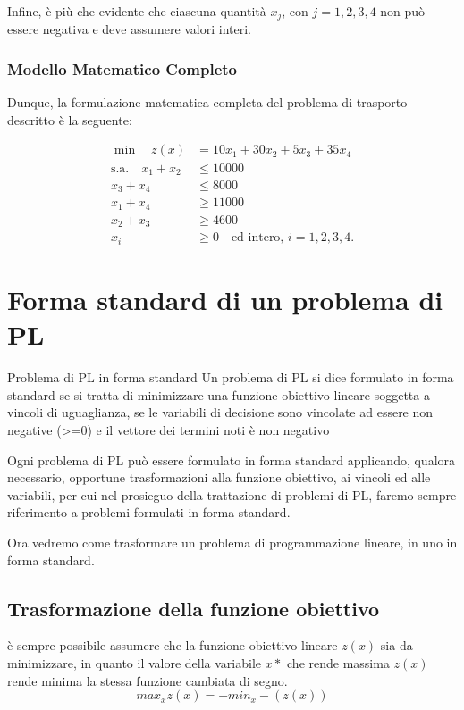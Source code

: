 Infine, è più che evidente che ciascuna quantità $x_j$, con $j = 1, 2, 3, 4$ non può essere negativa e deve assumere valori interi.

\subsubsection*{Modello Matematico Completo}
Dunque, la formulazione matematica completa del problema di trasporto descritto è la seguente:

\begin{align*}
\min \quad z(x) &= 10x_1 + 30x_2 + 5x_3 + 35x_4 \\
\text{s.a.} \quad x_1 + x_2 &\le 10000 \\
x_3 + x_4 &\le 8000 \\
x_1 + x_4 &\ge 11000 \\
x_2 + x_3 &\ge 4600 \\
x_i &\ge 0 \quad \text{ed intero, } i = 1, 2, 3, 4.
\end{align*}

\section{Forma standard di un problema di PL}
\begin{definition}{Problema di PL in forma standard}
Un problema di PL si dice formulato in forma standard
se si tratta di minimizzare una funzione obiettivo lineare soggetta a vincoli di
uguaglianza, se le variabili di decisione sono vincolate ad essere non negative (>=0)
e il vettore dei termini noti è non negativo
\end{definition}
Ogni problema di PL può essere formulato in forma standard applicando,
qualora necessario, opportune trasformazioni alla funzione obiettivo, ai vincoli ed alle variabili, per cui nel prosieguo della trattazione di problemi di
PL, faremo sempre riferimento a problemi formulati in forma standard.

Ora vedremo come trasformare un problema di programmazione lineare, in uno in forma standard.
\subsection{Trasformazione della funzione obiettivo}
è sempre possibile assumere che la funzione obiettivo lineare $z(x)$ sia da
minimizzare, in quanto il valore della variabile $x*$ che rende massima $z(x)$
rende minima la stessa funzione cambiata di segno.
\begin{equation}
    max_{x} z(x) = -min_{x} -(z(x))
\end{equation}
